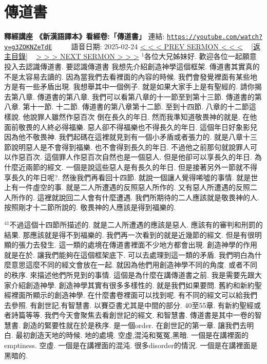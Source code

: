 \documentclass{book}
\begin{document}
\section{傳道書}
\label{sec:g3ZOKNZeTdE}
\textbf{釋經講座 《新漢語譯本》看經卷:「傳道書」}
\newline
\newline
連結: \href{https://youtube.com/watch?v=g3ZOKNZeTdE}{\texttt{https://youtube.com/watch?v=g3ZOKNZeTdE}} ~~~~ 語音日期: 2025-02-24
\newline
\newline
\hyperref[sec:JHWtWav3_Y8]{\small{< < < PREV SERMON < < <}}
~
\hyperref[sec:index]{\small{[返主目錄]}}
~
\hyperref[sec:R_hGKDVxBJo]{\small{> > > NEXT SERMON > > >}}
\newline
\newline
$^{1}$各位大兄姊妹好.
歡迎各位一起願意投入去認識傳道書.
要認識傳道書 我想先介紹創造神學這個框架.
傳道書其實真的不是太容易去讀的.
因為當我們去看裡面的內容的時候.
我們會發覺裡面有某些地方是有一些矛盾出現.
我想舉其中一個例子.
就是如果大家手上是有聖經的.
請你揭去第八章.
傳道書的第八章.
我們可以看第八章的十一節至到第十三節.
傳道書的第八章.
第十一節.
十二節.
傳道書的第八章第十二節.
至到十四節.
八章的十二節這樣說.
他說罪人雖然作惡百次 倒在長久的年日.
然而我準知道敬畏神的就是.
在他面前敬畏的人終必得福樂.
惡人卻不得福樂也不得長久的年日.
這個年日好象影兒 因為他不敬畏神.
我們起碼在這裡就見到有一個小矛盾或者張力的.
就是八章十三節說明惡人是不會得到福樂.
也不會得到長久的年日.
不過他之前那句就說罪人可以作惡百次.
這個罪人作惡百次自然也是一個惡人.
但是他卻可以享長久的年日.
為什麼近兩節的經文.
一個是說這些惡人是有長久的年日.
但是接著另外一節就不得享長久的年日呢?.
然後我們再看回十四節.
就說一個讓人覺得唏噓的事情.
就是世上有一件虛空的事.
就是二人所遭遇的反照惡人所作的.
又有惡人所遭遇的反照二人所作的.
這裡就說回二人會有什麼遭遇.
我們所期待的二人應該就是敬畏神的人.
按照剛才十二節所說的.
敬畏神的人應該是得到福樂的.

$^{41}$不過這個十四節所描述的.
就是二人所遭遇的應該是惡人.
應該有的審判和刑罰的結果.
那應該就是得不到福樂的.
我們再一次看到的就是近幾節的經文.
但是有很明顯的張力去發生.
這一類的處境在傳道書裡面不少地方都會出現.
創造神學的作用就是在於.
讓我們能夠在這個框架底下.
可以去處理到這一類的矛盾.
我們明白為什麼意思這麼不同的經文會放在一起.
就因為他們用創造神學不同的角度.
或者不同的秩序.
來描述他們所見到的事情.
這個是為什麼在講傳道書之前.
我是需要先跟大家介紹創造神學.
創造神學其實有很多多樣性的.
就是我們如果要問.
舊約和新約聖經裡面所顯示的創造神學.
在什麼書卷裡面可以找到呢.
有不同的經文可以給我們去參照.
有創世記,有智慧書.
以賽亞書尤其是中間的部分.
40至55章.
有新約聖經或者詩篇等等.
我們今天會聚焦去看創世記的經文.
和智慧書.
傳道書是其中一卷的智慧書.
創造的緊要性就在於是秩序.
是一個order.
在創世記的第一章.
讓我們去明白.
最初創造天地的時候.
地的處境.
空虛,混沌和冤冤,黑暗.
一個是在講裡面的emptiness.
空虛.
一個是在講裡面的混沌.
很多disorder的情況.
一個是在講裡面是黑暗的.
\end{document}
